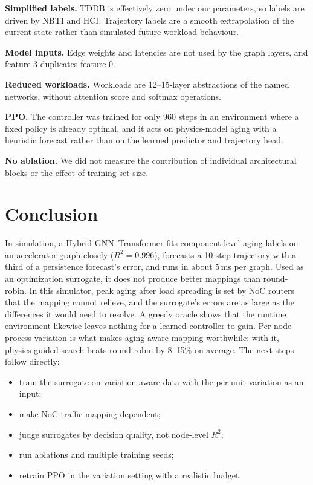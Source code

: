 \documentclass[conference]{IEEEtran}
\begin{document}
\textbf{Simplified labels.} TDDB is effectively zero under our parameters, so labels are driven by NBTI and HCI. Trajectory labels are a smooth extrapolation of the current state rather than simulated future workload behaviour.

\textbf{Model inputs.} Edge weights and latencies are not used by the graph layers, and feature 3 duplicates feature 0.

\textbf{Reduced workloads.} Workloads are 12--15-layer abstractions of the named networks, without attention score and softmax operations.

\textbf{PPO.} The controller was trained for only 960 steps in an environment where a fixed policy is already optimal, and it acts on physics-model aging with a heuristic forecast rather than on the learned predictor and trajectory head.

\textbf{No ablation.} We did not measure the contribution of individual architectural blocks or the effect of training-set size.

\section{Conclusion}
\label{sec:conclusion}

In simulation, a Hybrid GNN--Transformer fits component-level aging labels on an accelerator graph closely ($R^2 = 0.996$), forecasts a 10-step trajectory with a third of a persistence forecast's error, and runs in about 5\,ms per graph. Used as an optimization surrogate, it does not produce better mappings than round-robin. In this simulator, peak aging after load spreading is set by NoC routers that the mapping cannot relieve, and the surrogate's errors are as large as the differences it would need to resolve. A greedy oracle shows that the runtime environment likewise leaves nothing for a learned controller to gain. Per-node process variation is what makes aging-aware mapping worthwhile: with it, physics-guided search beats round-robin by 8--15\% on average. The next steps follow directly:
\begin{itemize}
    \item train the surrogate on variation-aware data with the per-unit variation as an input;
    \item make NoC traffic mapping-dependent;
    \item judge surrogates by decision quality, not node-level $R^2$;
    \item run ablations and multiple training seeds;
    \item retrain PPO in the variation setting with a realistic budget.
\end{itemize}
\end{document}
